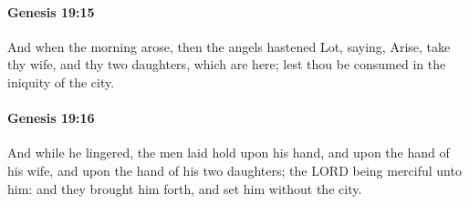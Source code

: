 		\paragraph{Genesis 19:15} %
			\label{GENESIS-19-15}

			And when the morning arose, then the angels hastened Lot, saying, Arise, take thy wife, and thy two daughters, which are here; lest thou be consumed in the iniquity of the city.


		\paragraph{Genesis 19:16} %
			\label{GENESIS-19-16}

			And while he lingered, the men laid hold upon his hand, and upon the hand of his wife, and upon the hand of his two daughters; the LORD being merciful unto him: and they brought him forth, and set him without the city.

